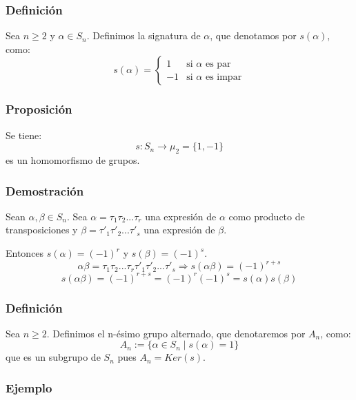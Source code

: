 \documentclass[11pt,a4paper]{article}
\begin{document}
\subsubsection*{Definición}

Sea $n \geq 2$ y $\alpha \in S_{n}$. Definimos la signatura de $\alpha$, que denotamos por $s(\alpha)$, como:
\begin{equation*}
s(\alpha) =
\begin{cases}
1 & \text{si } \alpha \text{ es par} \\
-1 & \text{si } \alpha \text{ es impar}
\end{cases}
\end{equation*}

\subsubsection*{Proposición}

Se tiene:
$$s: S_{n} \to \mu_{2} = \{1, -1\}$$
es un homomorfismo de grupos.

\subsubsection*{Demostración}

Sean $\alpha, \beta \in S_{n}$. Sea $\alpha = \tau_{1} \tau_{2} ... \tau_{r}$ una expresión de $\alpha$ como producto de transposiciones y $\beta = \tau'_{1} \tau'_{2} ... \tau'_{s}$ una expresión de $\beta$.

Entonces $s(\alpha) = (-1)^{r}$ y $s(\beta) = (-1)^{s}$.
$$\alpha \beta = \tau_{1} \tau_{2} ... \tau_{r} \tau'_{1} \tau'_{2} ... \tau'_{s} \Rightarrow s(\alpha \beta) = (-1)^{r+s}$$
$$s(\alpha \beta) = (-1)^{r+s} = (-1)^{r} (-1)^{s} = s(\alpha) s(\beta)$$

\subsubsection*{Definición}

Sea $n \geq 2$. Definimos el n-ésimo grupo alternado, que denotaremos por $A_{n}$, como:
$$A_{n} := \{ \alpha \in S_{n} \mid s(\alpha) = 1 \}$$
que es un subgrupo de $S_{n}$ pues $A_{n} = Ker(s)$.

\subsubsection*{Ejemplo}
\end{document}
